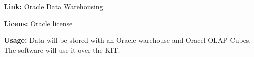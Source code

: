 \textbf{Link:} \href{http://www.oracle.com/de/technologies/datawarehousing/index.html}{Oracle Data Warehousing}

\textbf{Licens:} Oracle license

\textbf{Usage:} 
Data will be stored with an Oracle warehouse and Oracel OLAP-Cubes. The software will use it over the KIT.


% 
% 
% 


